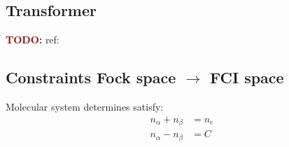 
\subsection{Transformer}
\textcolor{darkred}{\textbf{TODO:}} ref:\cite{zhang2023transformer,wu2023nnqs}

\subsection{Constraints Fock space \texorpdfstring{$\rightarrow$}{→} FCI space}

Molecular system determines satisfy:
\begin{equation}
    \begin{split}
    n_{\alpha} + n_{\beta} & = n_e \\
    n_{\alpha} - n_{\beta} & = C \\
    \end{split}
\end{equation}

